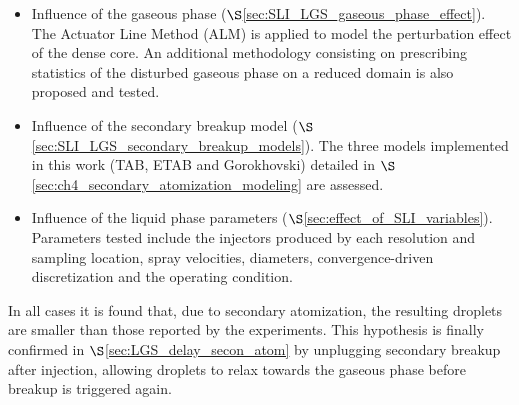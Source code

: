 \begin{itemize}

	\item Influence of the gaseous phase ($\S$\ref{sec:SLI_LGS_gaseous_phase_effect}). The Actuator Line Method (ALM) is applied to model the perturbation effect of the dense core. An additional methodology consisting on prescribing statistics of the disturbed gaseous phase on a reduced domain is also proposed and tested. %
	
	
	\vspace*{-0.05in}
	
	\item Influence of the secondary breakup model ($\S$\ref{sec:SLI_LGS_secondary_breakup_models}). The three models implemented in this work (TAB, ETAB and Gorokhovski) detailed in $\S$\ref{sec:ch4_secondary_atomization_modeling} are assessed. %
	
	
	\vspace*{-0.05in}
	
	\item Influence of the liquid phase parameters ($\S$\ref{sec:effect_of_SLI_variables}). Parameters tested include the injectors produced by each resolution and sampling location, spray velocities, diameters, convergence-driven discretization and the operating condition. %

\end{itemize}

In all cases it is found that, due to secondary atomization, the resulting droplets are smaller than those reported by the experiments. This hypothesis is finally confirmed in $\S$\ref{sec:LGS_delay_secon_atom} by unplugging secondary breakup after injection, allowing droplets to relax towards the gaseous phase before breakup is triggered again. 




